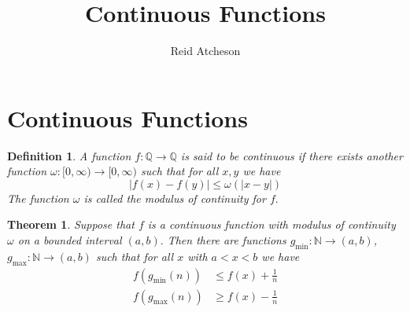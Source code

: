 \documentclass{article}
\newtheorem{definition}{Definition}
\newtheorem{theorem}{Theorem}
\begin{document}
\title{Continuous Functions}
\author{Reid Atcheson}
\maketitle


\section{Continuous Functions}


\begin{definition}
  A function $f : \mathbb{Q} \to \mathbb{Q}$ is said to be \emph{continuous} if there exists
  another function $\omega : [0,\infty) \to [0,\infty)$ such that for all $x,y$ we have
      \begin{equation*}
        |f(x)-f(y)| \leq \omega(|x-y|)
      \end{equation*}
  The function $\omega$ is called the \emph{modulus of continuity} for $f.$
\end{definition}


\begin{theorem}
  Suppose that $f$ is a continuous function with modulus of continuity $\omega$ on a bounded interval $(a,b).$ 
  Then there are functions
  $g_{\min} : \mathbb{N} \to (a,b)$, $g_{\max} : \mathbb{N} \to (a,b)$ such that for all $x$ with $a<x<b$ we have
  \begin{align*}
    f(g_{\min}(n)) &\leq f(x)+\frac{1}{n} \\
    f(g_{\max}(n)) &\geq f(x)-\frac{1}{n} \\
  \end{align*}
\end{theorem}
\end{document}
